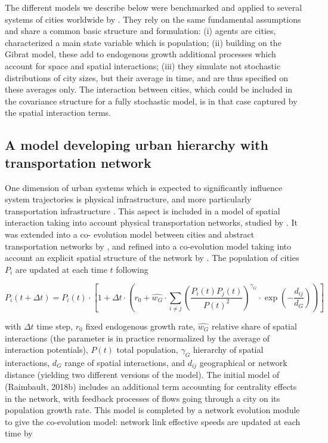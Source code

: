 \documentclass[10pt,letterpaper]{article}
\begin{document}
The different models we describe below were benchmarked and applied to several systems of cities worldwide by \citep{raimbault2020empowering}. They rely on the same fundamental assumptions and share a common basic structure and formulation: (i) agents are cities, characterized a main state variable which is population; (ii) building on the Gibrat model, these add to endogenous growth additional processes which account for space and spatial interactions; (iii) they simulate not stochastic distributions of city sizes, but their average in time, and are thus specified on these averages only. The interaction between cities, which could be included in the covariance structure for a fully stochastic model, is in that case captured by the spatial interaction terms.


\subsection{A model developing urban hierarchy with transportation network}


One dimension of urban systems which is expected to significantly influence system trajectories is physical infrastructure, and more particularly transportation infrastructure \citep{dupuy1987vers}. This aspect is included in a model of spatial interaction taking into account physical transportation networks, studied by \citep{raimbault2020indirect}. It was extended into a co- evolution model between cities and abstract transportation networks by \citep{raimbault2020modeling}, and refined into a co-evolution model taking into account an explicit spatial structure of the network by \citep{raimbault2020hierarchy}. The population of cities $P_i$ are updated at each time $t$ following

\begin{equation}
	P_i (t + \Delta t) = P_i(t) \cdot \left[ 1 + \Delta t \cdot \left( r_0 + \hat{w_G} \cdot \sum_{i \neq j} \left( \frac{P_i(t)P_j(t)}{P(t)^2}\right)^{\gamma_G}  \cdot \exp \left( - \frac{d_{ij}}{d_G} \right)\right) \right]	
\end{equation}

with $\Delta t$ time step, $r_0$ fixed endogenous growth rate, $\hat{w_G}$ relative share of spatial interactions (the parameter is in practice renormalized by the average of interaction potentials), $P(t)$ total population, $\gamma_G$ hierarchy of spatial interactions, $d_G$ range of spatial interactions, and $d_{ij}$ geographical or network distance (yielding two different versions of the model). The initial model of (Raimbault, 2018b) includes an additional term accounting for centrality effects in the network, with feedback processes of flows going through a city on its population growth rate. This model is completed by a network evolution module to give the co-evolution model: network link effective speeds are updated at each time by
\end{document}
